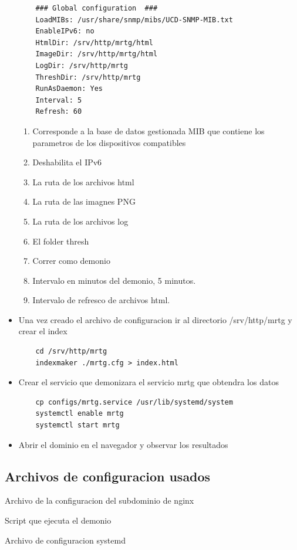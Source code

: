 \documentclass[letterpaper]{article}
\begin{document}
\begin{itemize}
  \begin{lstlisting}
    ### Global configuration  ###
    LoadMIBs: /usr/share/snmp/mibs/UCD-SNMP-MIB.txt
    EnableIPv6: no
    HtmlDir: /srv/http/mrtg/html
    ImageDir: /srv/http/mrtg/html
    LogDir: /srv/http/mrtg
    ThreshDir: /srv/http/mrtg
    RunAsDaemon: Yes
    Interval: 5
    Refresh: 60
  \end{lstlisting}
  \begin{enumerate}
    \item Corresponde a la base de datos gestionada MIB que contiene los parametros de los dispositivos compatibles
    \item Deshabilita el IPv6
    \item La ruta de los archivos html
    \item La ruta de las imagnes PNG
    \item La ruta de los archivos log
    \item El folder thresh
    \item Correr como demonio
    \item Intervalo en minutos del demonio, 5 minutos.
    \item Intervalo de refresco de archivos html.
  \end{enumerate}
  \item Una vez creado el archivo de configuracion ir al directorio /srv/http/mrtg y crear el index
  \begin{lstlisting}
    cd /srv/http/mrtg
    indexmaker ./mrtg.cfg > index.html
  \end{lstlisting}
  \item Crear el servicio que demonizara el servicio \acrshort{mrtg} que obtendra los datos
  \begin{lstlisting}
    cp configs/mrtg.service /usr/lib/systemd/system
    systemctl enable mrtg
    systemctl start mrtg
  \end{lstlisting}
  \item Abrir el dominio en el navegador y observar los resultados
\end{itemize}
\subsection{Archivos de configuracion usados}\label{sub:Archivos de configuracion usados} %
Archivo de la configuracion del subdominio de nginx

Script que ejecuta el demonio

Archivo de configuracion systemd


\newpage{}

\printglossary[type=\acronymtype]

\printglossary{}
\end{document}
